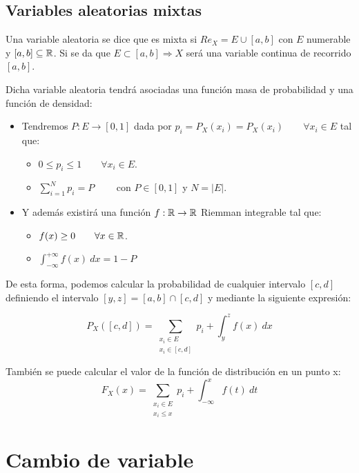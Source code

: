 \subsection{Variables aleatorias mixtas}

\begin{definicion}
    Una variable aleatoria se dice que es mixta si $Re_X = E \cup [a,b]$ con $E$ numerable y $[a,b]\subseteq \mathbb R$.
    Si se da que $E \subset [a,b] \Rightarrow X$ será una variable continua de recorrido $[a,b]$.
\end{definicion}

Dicha variable aleatoria tendrá asociadas una función masa de probabilidad y una función de densidad:
\begin{itemize}
    \item Tendremos $P:E\rightarrow [0,1]$ dada por $p_i = P_X(x_i) = P_X(x_i) \qquad \forall x_i \in E$ tal que:
    \begin{itemize}
      \item $0 \leq p_i \leq 1 \qquad \forall x_i \in E$.
      \item $\sum\limits_{i=1}^N p_i = P \qquad $ con $P\in [0,1]$ y $N=|E|$.
    \end{itemize}
    
    \item Y además existirá una función $f:\mathbb R \rightarrow \mathbb R$ Riemman integrable tal que:
    \begin{itemize}
      \item $f(x) \geq 0 \qquad \forall x \in \mathbb R$.
      \item $\displaystyle \int_{-\infty}^{+\infty} f(x)~dx = 1-P$
    \end{itemize}
\end{itemize}

\bigskip

De esta forma, podemos calcular la probabilidad de cualquier intervalo $[c,d]$ definiendo el intervalo $[y,z] = [a,b] \cap [c,d]$ y mediante la siguiente expresión:

$$P_X([c,d]) = \sum_{\substack{x_i \in E \\ x_i \in [c,d]}} p_i + \int_y^z f(x)~dx $$

También se puede calcular el valor de la función de distribución en un punto x:
$$F_X(x) = \sum_{\substack{x_i \in E \\ x_i \leq x}} p_i + \int_{-\infty}^x f(t)~dt$$

\section{Cambio de variable}


